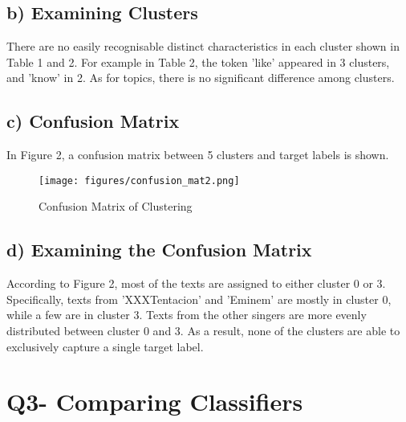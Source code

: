 \documentclass[a4paper,11pt]{article}
\begin{document}
\subsection{b) Examining Clusters}
There are no easily recognisable distinct characteristics in each cluster shown in Table 1 and 2.
For example in Table 2, the token 'like' appeared in 3 clusters, and 'know' in 2.
As for topics, there is no significant difference among clusters.
\subsection{c) Confusion Matrix}
In Figure 2, a confusion matrix between 5 clusters and target labels is shown.

\begin{figure}[htbp]
  \begin{center}
  \texttt{[image: figures/confusion\_mat2.png]}
  \caption{Confusion Matrix of Clustering}
  \end{center}
\end{figure}
\subsection{d) Examining the Confusion Matrix}

According to Figure 2, most of the texts are assigned to either cluster 0 or 3.
Specifically, texts from 'XXXTentacion' and 'Eminem' are mostly in cluster 0, while a few are in cluster 3.
Texts from the other singers are more evenly distributed between cluster 0 and 3.
As a result, none of the clusters are able to exclusively capture a single target label.



\section{Q3- Comparing Classifiers}
\end{document}

